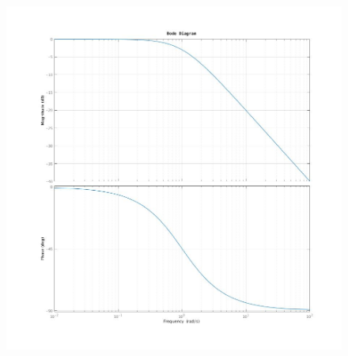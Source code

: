 \documentclass{article}
\begin{document}
			\begin{figure}[h!]
				\centering
				\includegraphics[scale=0.4]{./pictures/termine_binomio.jpg}
			\end{figure}

		\newpage
\end{document}
